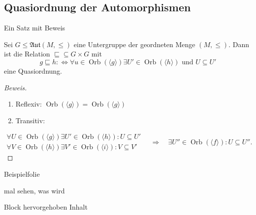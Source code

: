 \documentclass[presentation,t]{beamer}
\DeclareMathOperator\Orb{Orb}%
\begin{document}
\subsection{Quasiordnung der Automorphismen}
\label{sec-4-1}
\begin{frame}[label=sec-4-1-1]{Ein Satz mit Beweis}
\begin{theorem}[Quasiordnung]
Sei $G\leq \mathfrak{Aut}(M,\leq)$ eine Untergruppe der geordneten
Menge $(M,\leq)$. Dann ist die Relation ${\sqsubseteq}\subseteq
G\times G$ mit 
\[
g\sqsubseteq h :\Leftrightarrow ∀u∈\Orb(〈g〉)∃U'∈\Orb(〈h〉)\text{ und }U\subseteq U'
\]
eine Quasiordnung.
\end{theorem}

\begin{proof}[Beweis]
\begin{enumerate}
\item Reflexiv: $\Orb(〈g〉) = \Orb(〈g〉)$
\item Transitiv:
\end{enumerate}
\[
\begin{matrix}∀U∈\Orb(〈g〉)∃U'∈\Orb(〈h〉): U\subseteq U'\\
  ∀V∈\Orb(〈h〉)∃V'∈\Orb(〈i〉): V\subseteq V'
\end{matrix}\quad ⇒\quad ∃U''∈\Orb(〈f〉): U\subseteq U''.
\]\vspace{-0.25\baselineskip}
\end{proof}
\end{frame}
\begin{frame}[label=sec-4-1-2]{Beispielfolie}
\begin{example}[Beispieltitel]
mal sehen, was wird
\end{example}
\begin{alertblock}{Block hervorgehoben}
Inhalt
\end{alertblock}
\end{frame}
\end{document}
